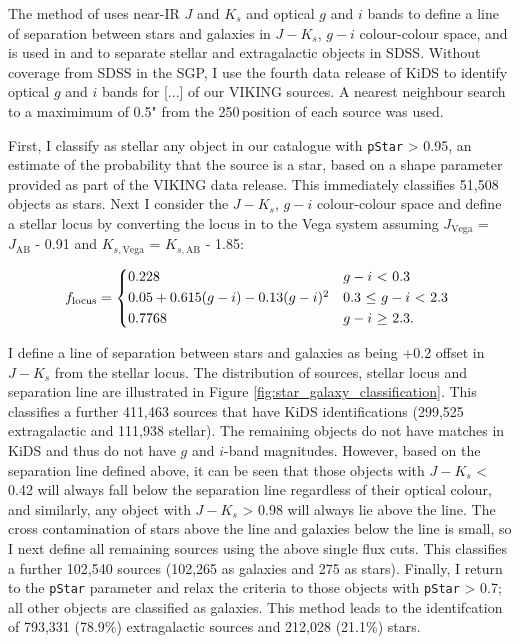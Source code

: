 The method of \citealt{Baldry_2010} uses near-IR $J$ and $K_s$ and optical $g$ and $i$ bands to define a line of separation between stars and galaxies in $J - K_s$, $g-i$ colour-colour space, and is used in \citealt{Bourne_2016} and \citealt{Furlanetto_2018} to separate stellar and extragalactic objects in SDSS. Without coverage from SDSS in the SGP, I use the fourth data release of KiDS to identify optical $g$ and $i$ bands for [...] of our VIKING sources. A nearest neighbour search to a maximimum of 0.5" from the 250\,\micron position of each source was used.

First, I classify as stellar any object in our catalogue with \texttt{pStar} > 0.95, an estimate of the probability that the source is a star, based on a shape parameter provided as part of the VIKING data release. This immediately classifies 51,508 objects as stars. Next I consider the $J - K_s$, $g-i$ colour-colour space and define a stellar locus by converting the locus in \citealt{Baldry_2010} to the Vega system assuming $J_{\textrm{Vega}}$ = $J_{\textrm{AB}}$ - 0.91 and $K_{s,\textrm{Vega}}$ = $K_{s,\textrm{AB}}$ - 1.85:

\begin{equation}
    f_{\textrm{locus}} = 
    \begin{cases*}
        0.228 & $g-i$ < 0.3 \\
        0.05 + 0.615(g-i) - 0.13(g-i)^2 & 0.3 $\leq$ $g-i$ < 2.3 \\
        0.7768 & $g-i$ $\geq$ 2.3.
    \end{cases*}
\label{eq:stellar_locus}
\end{equation}

I define a line of separation between stars and galaxies as being +0.2 offset in $J - K_s$ from the stellar locus. The distribution of sources, stellar locus and separation line are illustrated in Figure \ref{fig:star_galaxy_classification}. This classifies a further 411,463 sources that have KiDS identifications (299,525 extragalactic and 111,938 stellar). The remaining objects do not have matches in KiDS and thus do not have $g$ and $i$-band magnitudes. However, based on the separation line defined above, it can be seen that those objects with $J - K_s$ < 0.42 will always fall below the separation line regardless of their optical colour, and similarly, any object with  $J - K_s$ > 0.98 will always lie above the line. The cross contamination of stars above the line and galaxies below the line is small, so I next define all remaining sources using the above single flux cuts. This classifies a further 102,540 sources (102,265 as galaxies and 275 as stars). Finally, I return to the \texttt{pStar} parameter and relax the criteria to those objects with \texttt{pStar} > 0.7; all other objects are classified as galaxies. This method leads to the identifcation of 793,331 (78.9\%) extragalactic sources and 212,028 (21.1\%) stars.

